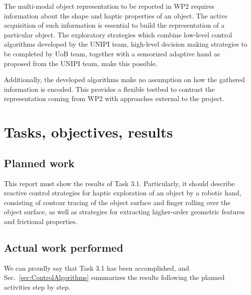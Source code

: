 \documentclass[a4paper,11pt,pdf]{pacmanreport}
\begin{document}
The multi-modal object representation to be reported in WP2 requires information about the shape and haptic properties of an object.
The active acquisition of such information is essential to build the representation of a particular object. The exploratory strategies which combine low-level control algorithms developed by the UNIPI team, high-level decision making strategies to be completed by UoB team, together with a sensorized adaptive hand as proposed from the UNIPI team, make this possible.

Additionally, the developed algorithms make no assumption on how the gathered information is encoded. This provides a flexible testbed to contrast the representation coming from WP2 with approaches external to the project.

\newpage

\section{Tasks, objectives, results}

\subsection{Planned work}

This report must show the results of Task 3.1. Particularly, it should describe reactive control strategies for haptic exploration of an object by a robotic hand, consisting of contour tracing of the object surface and finger rolling over the object surface, as well as strategies for extracting higher-order geometric features and frictional properties. 


\subsection{Actual work performed}

We can proudly say that Task 3.1 has been accomplished, and Sec.~\ref{sec:ControlAlgorithms} summarizes the results following the planned activities step by step.
\end{document}
